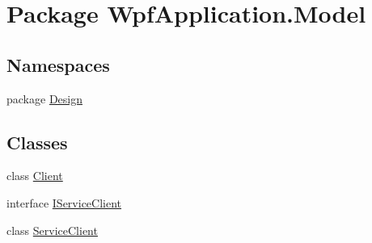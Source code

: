 \hypertarget{namespace_wpf_application_1_1_model}{\section{Package Wpf\-Application.\-Model}
\label{namespace_wpf_application_1_1_model}
}
\subsection*{Namespaces}
\begin{DoxyCompactItemize}
\item 
package \hyperlink{namespace_wpf_application_1_1_model_1_1_design}{Design}
\end{DoxyCompactItemize}
\subsection*{Classes}
\begin{DoxyCompactItemize}
\item 
class \hyperlink{class_wpf_application_1_1_model_1_1_client}{Client}
\item 
interface \hyperlink{interface_wpf_application_1_1_model_1_1_i_service_client}{I\-Service\-Client}
\item 
class \hyperlink{class_wpf_application_1_1_model_1_1_service_client}{Service\-Client}
\end{DoxyCompactItemize}
